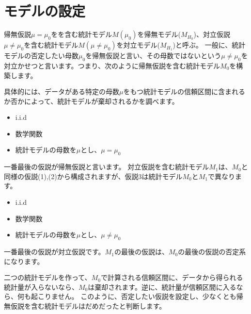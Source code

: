 
\section{モデルの設定}
帰無仮説$\mu=\mu_0$をを含む統計モデル$M(\mu_0)$を帰無モデル($M_{H_0}$)、対立仮説$\mu\neq \mu_0$を含む統計モデル$M(\mu\neq\mu_0)$を対立モデル($M_{H_1}$)と呼ぶ。
一般に、統計モデルの否定したい母数$\mu_0$を帰無仮説と言い、その母数ではないという$\mu\neq\mu_0$を対立かせつと言います。つまり、次のように帰無仮説を含む統計モデル$M_0$を構築します。

具体的には、データがある特定の母数$\mu$をもつ統計モデルの信頼区間に含まれるか否かによって、統計モデルが棄却されるかを調べます。
\begin{itemize}
    \item i.i.d
    \item 数学関数
    \item 統計モデルの母数を$\mu$とし、$\mu=\mu_0$
\end{itemize}
一番最後の仮説が帰無仮説と言います。
対立仮説を含む統計モデル$M_1$は、$M_0$と同様の仮説(1),(2)から構成されますが、仮説3は統計モデル$M_0$と$M_1$で異なります。
\begin{itemize}
    \item i.i.d
    \item 数学関数
    \item 統計モデルの母数を$\mu$とし、$\mu\neq\mu_0$
\end{itemize}
一番最後の仮説が対立仮説です。$M_1$の最後の仮説は、$M_0$の最後の仮説の否定系になります。

二つの統計モデルを作って、$M_0$で計算される信頼区間に、データから得られる統計量が入らないなら、$M_0$は棄却されます。逆に、統計量が信頼区間に入るなら、何も起こりません。
このように、否定したい仮説を設定し、少なくとも帰無仮説を含む統計モデルはだめだったと判断します。

